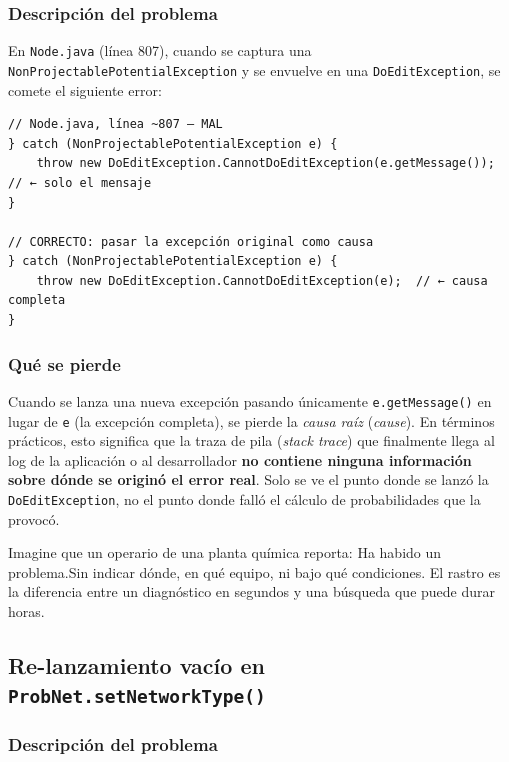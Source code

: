 \documentclass[11pt,a4paper]{article}
\begin{document}
\subsubsection{Descripción del problema}

En \texttt{Node.java} (línea 807), cuando se captura una \texttt{NonProjectablePotentialException}
y se envuelve en una \texttt{DoEditException}, se comete el siguiente error:

\begin{lstlisting}[caption={Pérdida del rastro de la excepción original en \texttt{Node.java}},label={lst:node-stacktrace}]
// Node.java, línea ~807 — MAL
} catch (NonProjectablePotentialException e) {
    throw new DoEditException.CannotDoEditException(e.getMessage()); // ← solo el mensaje
}

// CORRECTO: pasar la excepción original como causa
} catch (NonProjectablePotentialException e) {
    throw new DoEditException.CannotDoEditException(e);  // ← causa completa
}
\end{lstlisting}

\subsubsection{Qué se pierde}

Cuando se lanza una nueva excepción pasando únicamente \texttt{e.getMessage()} en lugar de
\texttt{e} (la excepción completa), se pierde la \emph{causa raíz} (\textit{cause}). En términos
prácticos, esto significa que la traza de pila (\textit{stack trace}) que finalmente llega al
log de la aplicación o al desarrollador \textbf{no contiene ninguna información sobre dónde
se originó el error real}. Solo se ve el punto donde se lanzó la \texttt{DoEditException}, no
el punto donde falló el cálculo de probabilidades que la provocó.

Imagine que un operario de una planta química reporta: \guillemotleft Ha habido un problema.\guillemotright  Sin indicar
dónde, en qué equipo, ni bajo qué condiciones. El rastro es la diferencia entre un diagnóstico
en segundos y una búsqueda que puede durar horas.

\subsection{Re-lanzamiento vacío en \texttt{ProbNet.setNetworkType()}}

\subsubsection{Descripción del problema}
\end{document}
